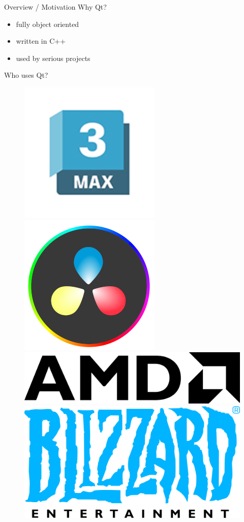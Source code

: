 \documentclass[11pt]{beamer}
\begin{document}
\begin{frame}{Overview / Motivation}
 Why Qt?
 \begin{itemize}
  \item fully object oriented
  \item written in C++
  \item used by serious projects
 \end{itemize}
 
 Who uses Qt?
 \begin{figure}
  \includegraphics[height=0.07\textheight]{assets/logo-3dstudiomax}
  \includegraphics[height=0.07\textheight]{assets/logo-davinci-resolve}
  \includegraphics[height=0.07\textheight]{assets/logo-amd}
  \includegraphics[height=0.07\textheight]{assets/logo-blizzard}

\end{figure}
\end{frame}
\end{document}
